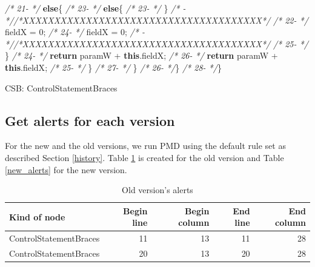 \documentclass[
]{article}
\newenvironment{Shaded}{\begin{snugshade}}{\end{snugshade}}
\newcommand{\CommentTok}[1]{\textcolor[rgb]{0.56,0.35,0.01}{\textit{#1}}}
\newcommand{\DecValTok}[1]{\textcolor[rgb]{0.00,0.00,0.81}{#1}}
\newcommand{\FunctionTok}[1]{\textcolor[rgb]{0.00,0.00,0.00}{#1}}
\newcommand{\KeywordTok}[1]{\textcolor[rgb]{0.13,0.29,0.53}{\textbf{#1}}}
\newcommand{\NormalTok}[1]{#1}
\begin{document}
\begin{Shaded}
\begin{Highlighting}[]
\CommentTok{/* 21-   */}        \KeywordTok{else}\NormalTok{\{                                            }\CommentTok{/* 23-   */}        \KeywordTok{else}\NormalTok{\{                                            }
\CommentTok{/* 23-   */}\NormalTok{     \}                                                        }\CommentTok{/*   -   *//*XXXXXXXXXXXXXXXXXXXXXXXXXXXXXXXXXXXXXX*/}               
\CommentTok{/* 22-   */}\NormalTok{            fieldX = }\DecValTok{0}\NormalTok{;                                  }\CommentTok{/* 24-   */}\NormalTok{            fieldX = }\DecValTok{0}\NormalTok{;                                  }
\CommentTok{/*   -   *//*XXXXXXXXXXXXXXXXXXXXXXXXXXXXXXXXXXXXXX*/}               \CommentTok{/* 25-   */}\NormalTok{        \}                                                }
\CommentTok{/* 24-   */}        \KeywordTok{return}\NormalTok{ paramW + }\KeywordTok{this}\NormalTok{.}\FunctionTok{fieldX}\NormalTok{;                     }\CommentTok{/* 26-   */}        \KeywordTok{return}\NormalTok{ paramW + }\KeywordTok{this}\NormalTok{.}\FunctionTok{fieldX}\NormalTok{;                     }
\CommentTok{/* 25-   */}\NormalTok{     \}                                                   }\CommentTok{/* 27-   */}\NormalTok{     \}                                                   }
\CommentTok{/* 26-   */}\NormalTok{\}                                                        }\CommentTok{/* 28-   */}\NormalTok{\}                                                        }


\NormalTok{CSB: ControlStatementBraces}
\end{Highlighting}
\end{Shaded}

\normalsize

\subsection{Get alerts for each version}

For the new and the old versions, we run PMD using the default rule set
as described Section \ref{history}. Table \ref{old_alerts} is created
for the old version and Table \ref{new_alerts} for the new version.

\small

\begin{table}[H]

\caption{\label{tab:unnamed-chunk-3}Old version's alerts\label{old_alerts}}
\centering
\begin{tabular}[t]{l|r|r|r|r}
\hline
Kind of node & Begin line & Begin column & End line & End column\\
\hline
\rowcolor{gray!6}  ControlStatementBraces & 11 & 13 & 11 & 28\\
\hline
ControlStatementBraces & 20 & 13 & 20 & 28\\
\hline
\end{tabular}
\end{table}
\end{document}
